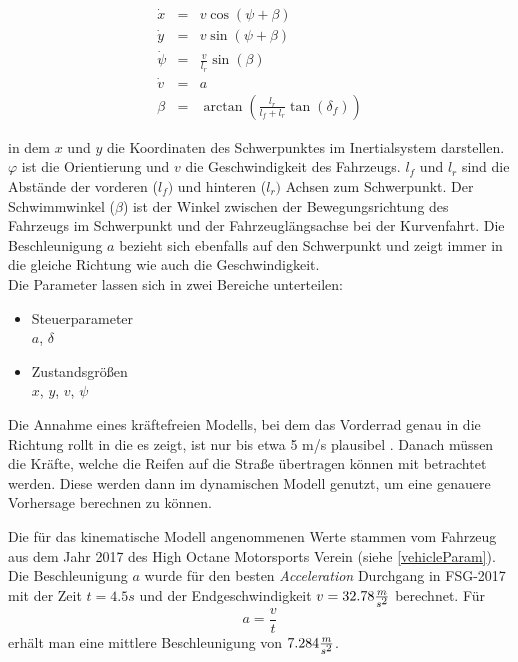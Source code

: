 \documentclass{like}
\begin{document}
\begin{eqnarray}
\label{kinDiscrete}
\dot{x}   &= &v  \cos(\psi + \beta)\\
\dot{y}   &= &v  \sin(\psi + \beta)\\
\dot{\psi} &= &\frac{v}{l_r} \sin(\beta) \\
\dot{v}    &= &a \\
\beta      &= &\arctan(\frac{l_r}{l_f + l_r} \tan(\delta_f))
\end{eqnarray}

in dem \(x\) und \(y\) die Koordinaten des Schwerpunktes im Inertialsystem darstellen. 
\(\varphi\) ist die Orientierung und \(v\) die Geschwindigkeit des Fahrzeugs. \(l_f\) und \(l_r\) sind die Abstände der vorderen (\(l_f)\) und hinteren (\(l_r)\) Achsen zum Schwerpunkt.
Der Schwimmwinkel (\(\beta\)) ist der Winkel  zwischen der Bewegungsrichtung des Fahrzeugs im Schwerpunkt und der Fahrzeuglängsachse bei der Kurvenfahrt. Die Beschleunigung \(a\) bezieht sich ebenfalls auf den Schwerpunkt und zeigt immer in die gleiche Richtung wie auch die Geschwindigkeit. \\
Die Parameter lassen sich in zwei Bereiche unterteilen:

\begin{itemize}
	\item Steuerparameter  \\
	\(a\), \(\delta\)
	\item Zustandsgrößen \\
	\(x\), \(y\), \(v\), \(\psi\)
	
\end{itemize}


Die Annahme eines kräftefreien Modells, bei dem das Vorderrad genau in die Richtung rollt in die es zeigt, ist nur bis etwa 5 m/s plausibel \cite{rajamani2011vehicle}. Danach müssen die Kräfte, welche die Reifen auf die Straße übertragen können mit betrachtet werden. Diese werden dann im dynamischen Modell genutzt, um eine genauere Vorhersage berechnen zu können.

Die für das kinematische Modell angenommenen Werte stammen vom Fahrzeug aus dem Jahr 2017 des High Octane Motorsports Verein (siehe \ref{vehicleParam}). Die Beschleunigung \(a\) wurde für den besten \textit{Acceleration} Durchgang in FSG-2017 mit der Zeit $t = 4.5s$ und der Endgeschwindigkeit $v = 32.78 \frac{m}{s\textsuperscript{2}}$ berechnet. Für 
\begin{equation}
a = \frac{v}{t}  \label{long_acc_kin}
\end{equation}
erhält man eine mittlere Beschleunigung von $7.284 \frac{m}{s\textsuperscript{2}} $.
\end{document}
